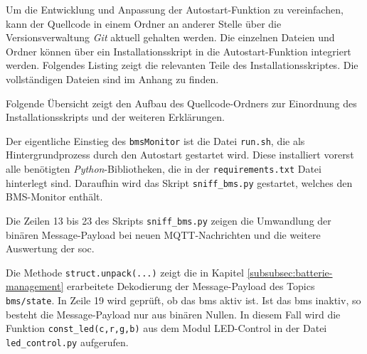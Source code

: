 Um die Entwicklung und Anpassung der Autostart-Funktion zu vereinfachen, kann der Quellcode in einem Ordner an anderer
Stelle über die Versionsverwaltung \emph{Git} aktuell gehalten werden.
Die einzelnen Dateien und Ordner können über ein Installationsskript in die Autostart-Funktion integriert werden.
Folgendes Listing zeigt die relevanten Teile des Installationsskriptes.
Die vollständigen Dateien sind im Anhang zu finden.



\noindent Folgende Übersicht zeigt den Aufbau des Quellcode-Ordners zur Einordnung des Installationsskripts und der weiteren Erklärungen.

\vspace*{5pt}

Der eigentliche Einstieg des \texttt{bmsMonitor} ist die Datei \texttt{run.sh}, die als Hintergrundprozess durch den
Autostart gestartet wird.
Diese installiert vorerst alle benötigten \emph{Python}-Bibliotheken, die in der \texttt{requirements.txt} Datei hinterlegt
sind.
Daraufhin wird das Skript \texttt{sniff\_bms.py} gestartet, welches den BMS-Monitor enthält.



\noindent Die Zeilen \num{13} bis \num{23} des Skripts \texttt{sniff\_bms.py} zeigen die Umwandlung der binären Message-Payload
bei neuen MQTT-Nachrichten und die weitere Auswertung der \gls{soc}.



\noindent Die Methode \texttt{struct.unpack(...)} zeigt die in Kapitel \ref{subsubsec:batterie-management} erarbeitete
Dekodierung der Message-Payload des Topics \texttt{bms/state}.
In Zeile \num{19} wird geprüft, ob das \gls{bms} aktiv ist.
Ist das \gls{bms} inaktiv, so besteht die Message-Payload nur aus binären Nullen.
In diesem Fall wird die Funktion \texttt{const\_led(c,r,g,b)} aus dem Modul LED-Control in der Datei \texttt{led\_control.py}
aufgerufen.

